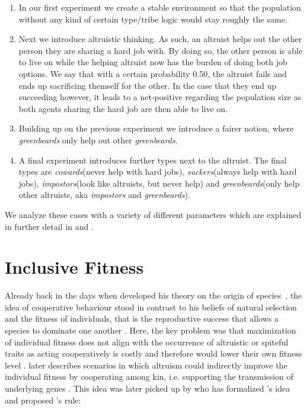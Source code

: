 \documentclass[sigconf]{acmart}
\newcommand{\todo}[1]{{\color{red}{#1}}}
\newcommand{\VProbAltruistDies}{0.50\xspace}
\newcommand{\cowards}{\textit{cowards}\xspace}
\newcommand{\suckers}{\textit{suckers}\xspace}
\newcommand{\impostors}{\textit{impostors}\xspace}
\newcommand{\greenbeards}{\textit{greenbeards}\xspace}
\begin{document}
    \begin{enumerate}
        \item In our first experiment we create a stable environment so that the population without any kind of certain type/tribe logic would stay roughly the same.

        \item Next we introduce altruistic thinking.
        As such, an altruist helps out the other person they are sharing a hard job with.
        By doing so, the other person is able to live on while the helping altruist now has the burden of doing both job options.
        We say that with a certain probability \VProbAltruistDies, the altruist fails and ends up sacrificing themself for the other.
        In the case that they end up succeeding however, it leads to a net-positive regarding the population size as both agents sharing the hard job are then able to live on.

        \item Building up on the previous experiment we introduce a fairer notion, where \greenbeards only help out other \greenbeards.

        \item A final experiment introduces further types next to the altruist.
        The final types are \cowards (never help with hard jobs), \suckers (always help with hard jobs), \impostors (look like altruists, but never help) and  \greenbeards (only help other altruists, aka \impostors and \greenbeards).

    \end{enumerate}

    We analyze these cases with a variety of different parameters which are explained in further detail in  and .

    \todo{Mention central results and key insight briefly.}


    \section{Inclusive Fitness}\label{sec:inclusive-fitness}

    Already back in the days when \citeauthor{darwin_origin_1859} developed his theory on the origin of species~\cite{darwin_origin_1859}, the idea of cooperative behaviour stood in contrast to his beliefs of natural selection and the fitness of individuals, that is the reproductive success that allows a species to dominate one another \cite{pennisi_how_2005}.
    Here, the key problem was that maximization of individual fitness does not align with the occurrence of altruistic or spiteful traits as acting cooperatively is costly and therefore would lower their own fitness level \cite{west_altruism_2010}.
    \citeauthor{darwin_origin_1859} later describes scenarios in which altruism could indirectly improve the individual fitness by cooperating among kin, i.e. supporting the transmission of underlying genes \cite{pennisi_how_2005,gardner_theory_2009}.
    This idea was later picked up by \citeauthor{hamilton_kin_1964} who has formalized \citeauthor{darwin_origin_1859}'s idea and proposed \citeauthor{hamilton_kin_1964}'s rule:
\end{document}
